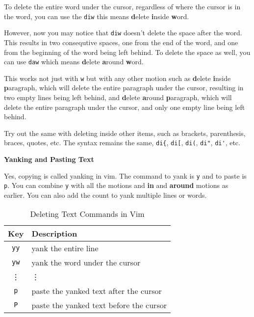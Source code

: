 To delete the entire word under the cursor, regardless of
where the cursor is in the word, you can use the \lstinline|diw|
this means \textbf{d}elete \textbf{i}nside \textbf{w}ord.

However, now you may notice that \lstinline|diw| doesn't delete
the space after the word. This results in two consequtive spaces,
one from the end of the word, and one from the beginning of the
word being left behind. To delete the space as well, you can use
\lstinline|daw| which means \textbf{d}elete \textbf{a}round \textbf{w}ord.

This works not just with \lstinline|w| but with any other motion
such as \textbf{d}elete \textbf{i}nside \textbf{p}aragraph,
which will delete the entire paragraph under the cursor,
resulting in two empty lines being left behind,
and \textbf{d}elete \textbf{a}round \textbf{p}aragraph,
which will delete the entire paragraph under the cursor,
and only one empty line being left behind.

Try out the same with deleting inside other items, such as
brackets, parenthesis, braces, quotes, etc. The syntax remains
the same, \lstinline|di{|, \lstinline|di[|, \lstinline|di(|, \lstinline|di"|, \lstinline|di'|, etc.

\textbf{Yanking and Pasting Text}

Yes, copying is called yanking in vim. The command to yank
is \lstinline|y| and to paste is \lstinline|p|.
You can combine \lstinline|y| with all the motions and
\textbf{in} and \textbf{around} motions as earlier.
You can also add the count to yank multiple lines or words.

\begin{table}[h!]
  \caption{Deleting Text Commands in Vim}
  \begin{tabular}{c l}
    \toprule
    Key & Description \\
    \midrule
    \lstinline|yy| & yank the entire line \\
    \lstinline|yw| & yank the word under the cursor \\
    \vdots & \vdots \\
    \lstinline|p| & paste the yanked text after the cursor \\
    \lstinline|P| & paste the yanked text before the cursor \\
    \bottomrule
  \end{tabular}
\end{table}

